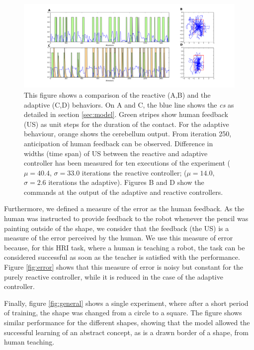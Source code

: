 \documentclass[letterpaper, 10 pt, conference]{ieeeconf}  %
\begin{document}
\begin{figure}
\centering
\includegraphics[width=20cm]{reactive_adaptive}
\caption{This figure shows a comparison of the reactive (A,B) and the adaptive (C,D) behaviors. On A and C, the blue line shows the \emph{cs} as detailed in section \ref{sec:model}. Green stripes show human feedback (US) as unit steps for the duration of the contact. For the adaptive behaviour, orange shows the cerebellum output. From iteration 250, anticipation of human feedback can be observed. Difference in widths (time span) of US between the reactive and adaptive controller has been measured for ten executions of the experiment ($ \mu = 40.4 $, $ \sigma = 33.0$ iterations the reactive controller; ($ \mu = 14.0 $, $ \sigma = 2.6$ iterations the adaptive). Figures B and D show the commands at the output of the  adaptive and reactive controllers. }
\label{fig:reactive}
\end{figure}

Furthermore, we defined a measure of the error as the human feedback. As the human was instructed to provide feedback to the robot whenever the pencil was painting outside of the shape, we consider that the feedback (the US) is a measure of the error perceived by the human. We use this measure of error because, for this HRI task, where a human is teaching a robot, the task can be considered successful as soon as the teacher is satisfied with the performance. Figure \ref{fig:error} shows that this measure of error is noisy but constant for the purely reactive controller, while it is reduced in the case of the adaptive controller. 

Finally, figure \ref{fig:general} shows a single experiment, where after a short period of training, the shape was changed from a circle to a square. The figure shows similar performance for the different shapes, showing that the model allowed the successful learning of an abstract concept, as is a drawn border of a shape, from human teaching. 
\end{document}
